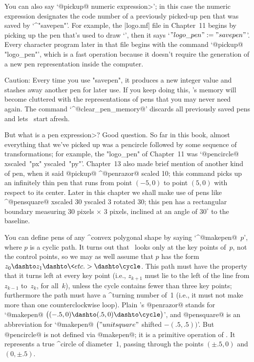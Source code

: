 {{{{You can also say `@pickup@ \<numeric expression>'; in this case the numeric
expression designates the code number of a previously picked-up pen
that was saved by `^"savepen"'. For example, the |logo.mf| file in Chapter~11
begins by picking up the pen that's used to draw `\MF\kern1pt', then
it says `$"logo\_pen":="savepen"$'. Every character program later in that
file begins with the command `@pickup@ "logo\_pen"', which is a fast
operation because it doesn't require the generation of a new
pen representation inside the computer.

\danger Caution: Every time you use "savepen", it produces a new integer
value and stashes away another pen for later use. If you keep doing this,
\MF's memory will become cluttered with the representations of pens
that you may never need again. The command `^@clear\_pen\_memory@'
discards all previously saved pens and lets \MF\ start afresh.

\danger But what is a \<pen expression>? Good question. So far in this book,
almost everything that we've picked up was a pencircle followed by
some sequence of transformations; for example, the "logo\_pen" of
Chapter~11 was `@pencircle@ xscaled~"px" yscaled~"py"'. Chapter~13
also made brief mention of another kind of pen, when it said
\begindisplay
@pickup@ ^@penrazor@ scaled 10;
\enddisplay
this command picks up an infinitely thin pen that runs from point
$(-5,0)$ to point $(5,0)$ with respect to its center. Later in this
chapter we shall make use of pens like
\begindisplay
^@pensquare@ xscaled 30 yscaled 3 rotated 30;
\enddisplay
this pen has a rectangular boundary measuring 30 pixels $\times$ 3 pixels,
inclined at an angle of $30^\circ$ to the baseline.

\danger You can define pens of any ^{convex polygon}al shape by saying
`^@makepen@~$p$', where $p$ is a cyclic path. It turns out that \MF\
looks only at the key points of~$p$, not the control points, so we may
as well assume that $p$ has the form $z_0\dashto z_1\dashto\<etc.>\dashto
\cycle$. This path must have the property that it turns left at every
key point (i.e., $z_{k+1}$ must lie to the left of the line from $z_{k-1}$
to~$z_k$, for all~$k$), unless the cycle contains fewer than three key
points; furthermore the path must have a ^{turning number} of~1 (i.e.,
it must not make more than one counterclockwise loop). Plain \MF's
@penrazor@ stands for
`@makepen@ $\bigl((-.5,0)\dashto(.5,0)\dashto \cycle\bigr)$',
and @pensquare@ is an abbreviation for
`@makepen@ $\bigl("unitsquare"$ shifted $-(.5,.5)\bigr)$'.
But @pencircle@ is not defined via @makepen@; it is a
primitive operation of \MF. It represents a true ^{circle} of diameter~1,
passing through the points $(\pm.5,0)$ and $(0,\pm.5)$.

}}}}
